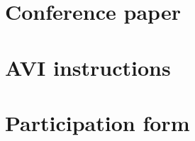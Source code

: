 
\chapter{Conference paper}
\cleardoublepage
\label{apx:conference_paper}


\chapter{AVI instructions}
\cleardoublepage
\label{apx:video_recording_instructions}


\chapter{Participation form}
\cleardoublepage
\label{apx:participation_form}
